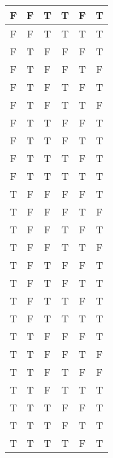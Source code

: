 \documentclass{article}
\begin{document}
\begin{enumerate}
\begin{table} [H]
\begin{tabular}{ | c | c | c | c | c | c | }
                \hline
                F & F & T & T & F & T \\
                \hline
                F & F & T & T & T & T \\
                \hline
                F & T & F & F & F & T \\
                \hline
                F & T & F & F & T & F \\
                \hline
                F & T & F & T & F & T \\
                \hline
                F & T & F & T & T & F \\
                \hline
                F & T & T & F & F & T \\
                \hline
                F & T & T & F & T & T \\
                \hline
                F & T & T & T & F & T \\
                \hline
                F & T & T & T & T & T \\
                \hline
                T & F & F & F & F & T \\
                \hline
                T & F & F & F & T & F \\
                \hline
                T & F & F & T & F & T \\
                \hline
                T & F & F & T & T & F \\
                \hline
                T & F & T & F & F & T \\
                \hline
                T & F & T & F & T & T \\
                \hline
                T & F & T & T & F & T \\
                \hline
                T & F & T & T & T & T \\
                \hline
                T & T & F & F & F & T \\
                \hline
                T & T & F & F & T & F \\
                \hline
                T & T & F & T & F & F \\
                \hline
                T & T & F & T & T & T \\
                \hline
                T & T & T & F & F & T \\
                \hline
                T & T & T & F & T & T \\
                \hline
                T & T & T & T & F & T \\

\end{tabular}
\end{table}
\end{enumerate}
\end{document}
